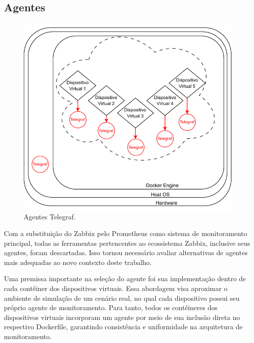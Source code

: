 \break

\subsection{Agentes}
\label{subsection:Agentes}

\begin{figure}[H]
\centering
\includegraphics[scale=1]{Imagens/chap03/by-blocks/agents_diagram.pdf}
\caption{Agentes Telegraf.}
\label{fig:DiagramaAgentes}
\end{figure}

Com a substituição do Zabbix pelo Prometheus como sistema de monitoramento principal, todas as ferramentas pertencentes ao ecossistema Zabbix, inclusive seus agentes, foram descartadas. Isso tornou necessário avaliar alternativas de agentes mais adequadas ao novo contexto deste trabalho.

Uma premissa importante na seleção do agente foi sua implementação dentro de cada contêiner dos dispositivos virtuais. Essa abordagem visa aproximar o ambiente de simulação de um cenário real, no qual cada dispositivo possui seu próprio agente de monitoramento. Para tanto, todos os contêineres dos dispositivos virtuais incorporam um agente por meio de sua inclusão direta no respectivo Dockerfile, garantindo consistência e uniformidade na arquitetura de monitoramento.

